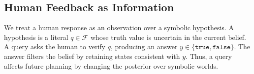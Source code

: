 \subsection{Human Feedback as Information}

We treat a human response as an observation over a symbolic hypothesis. A hypothesis is a literal $q \in \mathcal{F}$ whose truth value is uncertain in the current belief. A query asks the human to verify $q$, producing an answer $y \in \{\texttt{true},\texttt{false}\}$. The answer filters the belief by retaining states consistent with $y$. Thus, a query affects future planning by changing the posterior over symbolic worlds.
